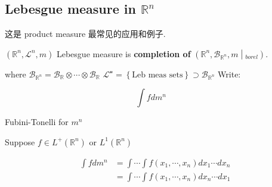\documentclass{qlnotes-export}
\begin{document}
\subsection{\texorpdfstring{Lebesgue measure in \({\mathbb{R}}^{n}\)}{Lebesgue measure in \{\textbackslash mathbb\{R\}\}\^{}\{n\}}}\label{lebesgue-measure-in-mathbbrn}

这是 product measure 最常见的应用和例子.

\begin{definition}\label{def-07-lebesgue-measure-on-r-n-definition-001}

\(({\mathbb{R}}^{n},\mathcal{L}^{n},m)\) Lebesgue measure is \textbf{completion of} \(\left. ({\mathbb{R}}^{n},\mathcal{B}_{{\mathbb{R}}^{n}},m \middle| {}_{borel}) \right.\).

\end{definition}

where \(\mathcal{B}_{{\mathbb{R}}^{n}} = \mathcal{B}_{\mathbb{R}} \otimes \cdots \otimes \mathcal{B}_{\mathbb{R}}\) \(\mathcal{L}^{\mathcal{n}} = \left\{ \text{Leb meas sets} \right\} \supset \mathcal{B}_{{\mathbb{R}}^{n}}\) Write:

\[\int f dm^{n}\quad\]

\begin{theorem}{Fubini-Tonelli for \(m^{n}\)}\label{thm-07-lebesgue-measure-on-r-n-fubini-tonelli-for-m-n}

Suppose \(f \in L^{+}({\mathbb{R}}^{n})\) or \(L^{1}({\mathbb{R}}^{n})\)

\[\begin{matrix}
{\int f dm^{n}} & {= \int\cdots\int f(x_{1},\cdots,x_{n}) dx_{1}\cdots dx_{n}} \\
 & {= \int\cdots\int f(x_{1},\cdots,x_{n}) dx_{n}\cdots dx_{1}}
\end{matrix}\]

\end{theorem}
\end{document}
